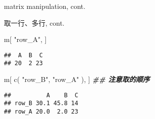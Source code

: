 \documentclass[ignorenonframetext,]{beamer}
\newenvironment{Shaded}{\begin{snugshade}}{\end{snugshade}}
\newcommand{\DocumentationTok}[1]{\textcolor[rgb]{0.56,0.35,0.01}{\textbf{\textit{#1}}}}
\newcommand{\FunctionTok}[1]{\textcolor[rgb]{0.00,0.00,0.00}{#1}}
\newcommand{\NormalTok}[1]{#1}
\newcommand{\StringTok}[1]{\textcolor[rgb]{0.31,0.60,0.02}{#1}}
\newcommand\FontSmall{\fontsize{7}{8}\selectfont}
\begin{document}
\begin{frame}[fragile]{matrix manipulation, cont.}
\protect\hypertarget{matrix-manipulation-cont.}{}
\begin{block}{取一行、多行, cont.}
\protect\hypertarget{ux53d6ux4e00ux884cux591aux884c-cont.}{}
\FontSmall

\begin{Shaded}
\begin{Highlighting}[]
\NormalTok{m[ }\StringTok{"row\_A"}\NormalTok{, ]}
\end{Highlighting}
\end{Shaded}

\begin{verbatim}
##  A  B  C 
## 20  2 23
\end{verbatim}

\begin{Shaded}
\begin{Highlighting}[]
\NormalTok{m[ }\FunctionTok{c}\NormalTok{( }\StringTok{"row\_B"}\NormalTok{, }\StringTok{"row\_A"}\NormalTok{ ), ] }\DocumentationTok{\#\# 注意取的顺序}
\end{Highlighting}
\end{Shaded}

\begin{verbatim}
##          A    B  C
## row_B 30.1 45.8 14
## row_A 20.0  2.0 23
\end{verbatim}
\end{block}
\end{frame}
\end{document}
